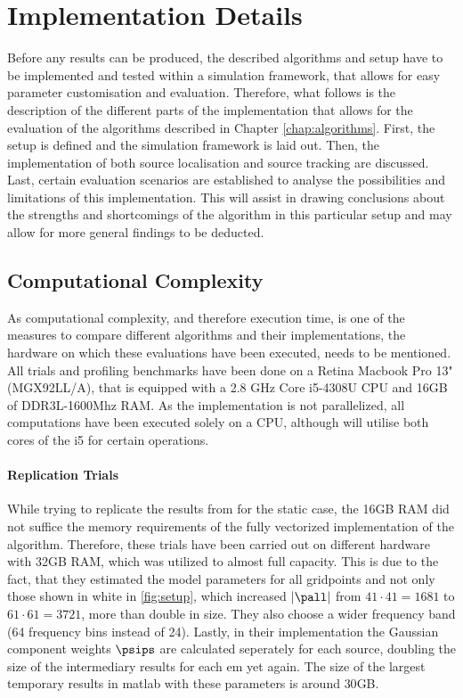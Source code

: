 \section{Implementation Details}
\label{chap:implementation}

Before any results can be produced, the described algorithms and setup have to be implemented and tested within a simulation framework, that allows for easy parameter customisation and evaluation. Therefore, what follows is the description of the different parts of the implementation that allows for the evaluation of the algorithms described in Chapter \ref{chap:algorithms}. First, the setup is defined and the simulation framework is laid out. Then, the implementation of both source localisation and source tracking are discussed. Last, certain evaluation scenarios are established to analyse the possibilities and limitations of this implementation. This will assist in drawing conclusions about the strengths and shortcomings of the algorithm in this particular setup and may allow for more general findings to be deducted.

\subsection{Computational Complexity}\label{sec:computationalComplexity} As computational complexity, and therefore execution time, is one of the measures to compare different algorithms and their implementations, the hardware on which these evaluations have been executed, needs to be mentioned. All trials and profiling benchmarks have been done on a Retina Macbook Pro 13" (MGX92LL/A), that is equipped with a 2.8 GHz Core i5-4308U CPU and 16GB of DDR3L-1600Mhz RAM. As the implementation is not parallelized, all computations have been executed solely on a CPU, although \matlab will utilise both cores of the i5 for certain operations.

\paragraph{Replication Trials}
While trying to replicate the results from \cite{Schwartz2014} for the static case, the 16GB RAM did not suffice the memory requirements of the fully vectorized implementation of the algorithm. Therefore, these trials have been carried out on different hardware with 32GB RAM, which was utilized to almost full capacity. This is due to the fact, that they estimated the model parameters for all gridpoints and not only those shown in white in \autoref{fig:setup}, which increased $|\pall|$ from $41 \cdot 41 = 1681$ to $61\cdot61=3721$, more than double in size. They also choose a wider frequency band (64 frequency bins instead of 24). Lastly, in their implementation the Gaussian component weights $\psips$ are calculated seperately for each source, doubling the size of the intermediary results for each \gls{em} yet again. The size of the largest temporary results in matlab with these parameters is around $30$GB.
